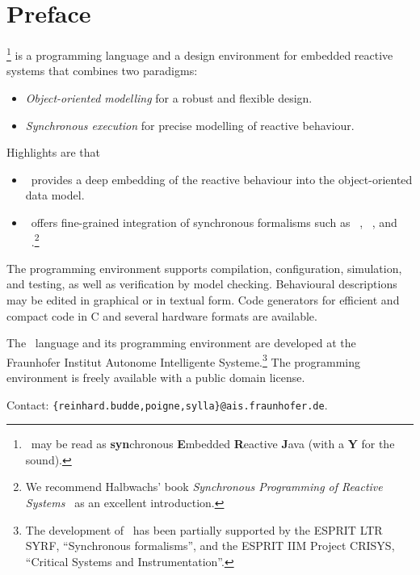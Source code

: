 
\section*{Preface}

\se\footnote{\sef\ may be read as \textbf{syn}chronous
\textbf{E}mbedded \textbf{R}eactive \textbf{J}ava (with a \textbf{Y}
for the sound).} is a programming language and a design environment for
embedded reactive systems that combines two paradigms:
\begin{itemize}
    \item \emph{Object-oriented modelling} for a robust and flexible
    design.
      
    \item \emph{Synchronous execution} for precise modelling of
    reactive behaviour.
\end{itemize}
Highlights are that
\begin{itemize}
\item \se\ provides a deep embedding of the reactive behaviour into
      the object-oriented data model.
\item \se\ offers fine-grained integration of synchronous formalisms
      such as \esterel~\cite{esterel}, \lustre~\cite{lustre}, and
      \statecharts~\cite{statecharts}.\footnote{We recommend Halbwachs' book
      \emph{Synchronous Programming of Reactive Systems}~\cite{halbwachs} as 	an excellent introduction.}
\end{itemize}

The programming environment supports compilation, configuration,
simulation, and testing, as well as verification by model checking. 
Behavioural descriptions may be edited in graphical or in textual
form.  Code generators for efficient and compact code in C and several
hardware formats are available.

The \se\ language and its programming environment are developed
at the Fraunhofer Institut Autonome Intelligente Systeme.\footnote{The
development of \sef\ has been partially supported by the ESPRIT LTR
SYRF, ``Synchronous formalisms'', and the ESPRIT IIM Project CRISYS,
``Critical Systems and Instrumentation''.}  The programming
environment is freely available with a public domain license.
\newline

\noindent Contact:  
{\tt\small \{reinhard.budde,poigne,sylla\}@ais.fraunhofer.de}.

